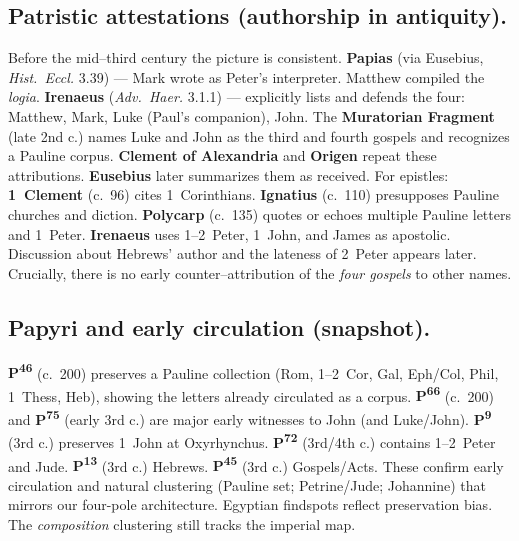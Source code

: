 \subsection{Patristic attestations (authorship in antiquity).}
Before the mid–third century the picture is consistent.
\textbf{Papias} (via Eusebius, \textit{Hist.\ Eccl.} 3.39) — Mark wrote as Peter’s interpreter.
Matthew compiled the \textit{logia}.
\textbf{Irenaeus} (\textit{Adv.\ Haer.} 3.1.1) — explicitly lists and defends the four: Matthew, Mark, Luke (Paul’s companion), John.
The \textbf{Muratorian Fragment} (late 2nd c.) names Luke and John as the third and fourth gospels and recognizes a Pauline corpus.
\textbf{Clement of Alexandria} and \textbf{Origen} repeat these attributions.
\textbf{Eusebius} later summarizes them as received.
For epistles: \textbf{1~Clement} (c.~96) cites 1~Corinthians.
\textbf{Ignatius} (c.~110) presupposes Pauline churches and diction.
\textbf{Polycarp} (c.~135) quotes or echoes multiple Pauline letters and 1~Peter.
\textbf{Irenaeus} uses 1–2~Peter, 1~John, and James as apostolic.
Discussion about Hebrews’ author and the lateness of 2~Peter appears later.
Crucially, there is no early counter–attribution of the \emph{four gospels} to other names.

\subsection{Papyri and early circulation (snapshot).}
\textbf{P\textsuperscript{46}} (c.~200) preserves a Pauline collection (Rom, 1–2~Cor, Gal, Eph/Col, Phil, 1~Thess, Heb), showing the letters already circulated as a corpus.
\textbf{P\textsuperscript{66}} (c.~200) and \textbf{P\textsuperscript{75}} (early 3rd c.) are major early witnesses to John (and Luke/John).
\textbf{P\textsuperscript{9}} (3rd c.) preserves 1~John at Oxyrhynchus.
\textbf{P\textsuperscript{72}} (3rd/4th c.) contains 1–2~Peter and Jude.
\textbf{P\textsuperscript{13}} (3rd c.) Hebrews.
\textbf{P\textsuperscript{45}} (3rd c.) Gospels/Acts.
These confirm early circulation and natural clustering (Pauline set; Petrine/Jude; Johannine) that mirrors our four-pole architecture.
Egyptian findspots reflect preservation bias.
The \emph{composition} clustering still tracks the imperial map.

